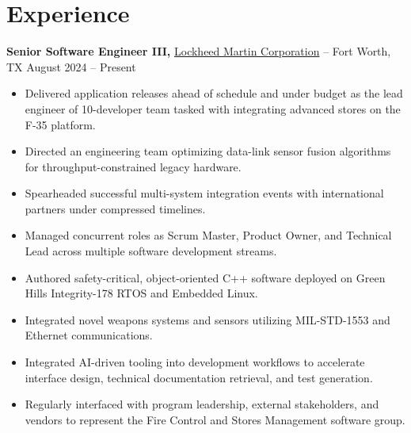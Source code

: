 \documentclass[11pt]{article}       %
\begin{document}
\section*{Experience}
\textbf{Senior Software Engineer III,} \href{https://www.lockheedmartin.com/}{Lockheed Martin Corporation} -- Fort Worth, TX \hfill August 2024 -- Present \\
\vspace{-9pt}
\begin{itemize}
  \item Delivered application releases ahead of schedule and under budget as the lead engineer of 10-developer team tasked with integrating advanced stores on the F-35 platform.
  \item Directed an engineering team optimizing data-link sensor fusion algorithms for throughput-constrained legacy hardware.
  \item Spearheaded successful multi-system integration events with international partners under compressed timelines.
  \item Managed concurrent roles as Scrum Master, Product Owner, and Technical Lead across multiple software development streams.
  \item Authored safety-critical, object-oriented C++ software deployed on Green Hills Integrity-178 RTOS and Embedded Linux.
  \item Integrated novel weapons systems and sensors utilizing MIL-STD-1553 and Ethernet communications.
  \item Integrated AI-driven tooling into development workflows to accelerate interface design, technical documentation retrieval, and test generation.
  \item Regularly interfaced with program leadership, external stakeholders, and vendors to represent the Fire Control and Stores Management software group.
\end{itemize}
\end{document}
